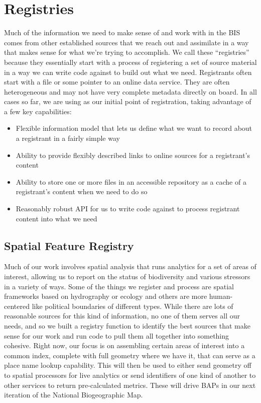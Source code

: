 \documentclass[letterpaper,10pt,english]{sphinxmanual}
\begin{document}
\section{Registries}
\label{\detokenize{bis:registries}}
Much of the information we need to make sense of and work with in the BIS comes from other established sources that we reach out and assimilate in a way that makes sense for what we’re trying to accomplish. We call these “registries” because they essentially start with a process of registering a set of source material in a way we can write code against to build out what we need. Registrants often start with a file or some pointer to an online data service. They are often heterogeneous and may not have very complete metadata directly on board. In all cases so far, we are using  as our initial point of registration, taking advantage of a few key capabilities:
\begin{itemize}
\item {} 
Flexible information model that lets us define what we want to record about a registrant in a fairly simple way

\item {} 
Ability to provide flexibly described links to online sources for a registrant’s content

\item {} 
Ability to store one or more files in an accessible repository as a cache of a registrant’s content when we need to do so

\item {} 
Reasonably robust API for us to write code against to process registrant content into what we need

\end{itemize}


\subsection{Spatial Feature Registry}
\label{\detokenize{bis:spatial-feature-registry}}
Much of our work involves spatial analysis that runs analytics for a set of areas of interest, allowing us to report on the status of biodiversity and various stressors in a variety of ways. Some of the things we register and process are spatial frameworks based on hydrography or ecology and others are more human-centered like political boundaries of different types. While there are lots of reasonable sources for this kind of information, no one of them serves all our needs, and so we built a registry function to identify the best sources that make sense for our work and run code to pull them all together into something cohesive. Right now, our focus is on assembling certain areas of interest into a common index, complete with full geometry where we have it, that can serve as a place name lookup capability. This will then be used to either send geometry off to spatial processors for live analytics or send identifiers of one kind of another to other services to return pre-calculated metrics. These will drive BAPs in our next iteration of the National Biogeographic Map.
\end{document}
